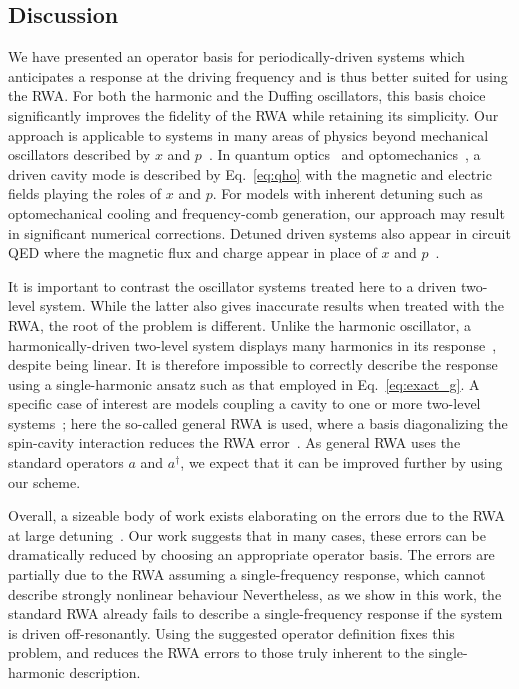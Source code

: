 \subsection{Discussion}
We have presented an operator basis for periodically-driven systems which anticipates a response at the driving frequency and is thus better suited for using the RWA. For both the harmonic and the Duffing oscillators, this basis choice significantly improves the fidelity of the RWA while retaining its simplicity. Our approach is applicable to systems in many areas of physics beyond mechanical oscillators described by $x$ and $p$~\cite{Bachtold_2022}. In quantum optics~\cite{Walls_Milburn} and optomechanics~\cite{Aspelmeyer_2014}, a driven cavity mode is described by Eq.~\eqref{eq:qho} with the magnetic and electric fields playing the roles of $x$ and $p$. For models with inherent detuning such as optomechanical cooling and frequency-comb generation, our approach may result in significant numerical corrections. Detuned driven systems also appear in circuit QED where the magnetic flux and charge appear in place of $x$ and $p$~\cite{Blais_2021}.

It is important to contrast the oscillator systems treated here to a driven two-level system. While the latter also gives inaccurate results when treated with the RWA, the root of the problem is different. Unlike the harmonic oscillator, a harmonically-driven two-level system displays many harmonics in its response~\cite{Zeuch_2020}, despite being linear. It is therefore impossible to correctly describe the response using a single-harmonic ansatz such as that employed in Eq.~\eqref{eq:exact_g}. A specific case of interest are models coupling a cavity to one or more two-level systems~\cite{Shore_1993,Kirton_2019}; here the so-called general RWA is used, where a basis diagonalizing the spin-cavity interaction reduces the RWA error~\cite{Irish_2007}. As general RWA uses the standard operators $a$ and $a^\dagger$, we expect that it can be improved further by using our scheme. 

Overall, a sizeable body of work exists elaborating on the errors due to the RWA at large detuning~\cite{Baker_2018, Niemczyk_2010, Bishop_2010, Sornborger_2004}. Our work suggests that in many cases, these errors can be dramatically reduced by choosing an appropriate operator basis. The errors are partially due to the RWA assuming a single-frequency response, which cannot describe strongly nonlinear behaviour Nevertheless, as we show in this work, the standard RWA already fails to describe a single-frequency response if the system is driven off-resonantly. Using the suggested operator definition fixes this problem, and reduces the RWA errors to those truly inherent to the single-harmonic description.

